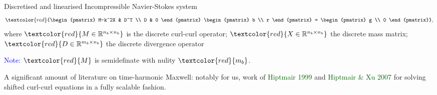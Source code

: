 \documentclass[handout]{beamer}
\newcommand{\gr}[1]{\textcolor{darkgreen} {#1}}
\newcommand{\re}[1]{{\textcolor{red}       {#1}}}
\newcommand{\bl}[1]{{\textcolor{blue}{#1}}}
\begin{document}
\begin{frame}
Discretised and linearised Incompressible Navier-Stokes system
\begin{equation}
\nonumber
\re{\begin{pmatrix}
M-k^2X & D^T \\
D & 0
\end{pmatrix}
\begin{pmatrix}
b \\
r
\end{pmatrix}
=
\begin{pmatrix}
g \\
0
\end{pmatrix}},
\end{equation}
where $\re{M\in\mathbb{R}^{n_b\times n_b}}$ is the discrete curl-curl operator; $\re{X\in\mathbb{R}^{n_b\times n_b}}$ the discrete mass matrix; $\re{D\in\mathbb{R}^{m_b\times n_b}}$ the discrete divergence operator

\vspace{2mm}

\bl{Note:} $\re{M}$ is semidefinate with nulity $\re{m_b}$.

\vspace{2mm}

A significant amount of literature on time-harmonic Maxwell: notably for us, work of \gr{Hiptmair 1999} and \gr{Hiptmair \& Xu 2007} for solving shifted curl-curl equations in a fully scalable fashion.



\end{frame}
\end{document}

